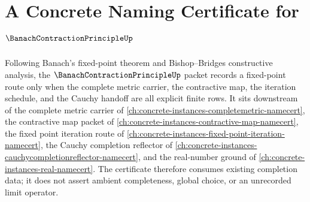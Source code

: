 \chapter{A Concrete Naming Certificate for $\BanachContractionPrincipleUp$}
\label{ch:concrete-instances-banach-contraction-principle-namecert}

Following Banach's fixed-point theorem and Bishop--Bridges constructive
analysis, the $\BanachContractionPrincipleUp$ packet records a fixed-point
route only when the complete metric carrier, the contractive map, the
iteration schedule, and the Cauchy handoff are all explicit finite rows. It
sits downstream of the complete metric carrier of
\autoref{ch:concrete-instances-completemetric-namecert}, the contractive map
packet of \autoref{ch:concrete-instances-contractive-map-namecert}, the fixed
point iteration route of
\autoref{ch:concrete-instances-fixed-point-iteration-namecert}, the Cauchy
completion reflector of
\autoref{ch:concrete-instances-cauchycompletionreflector-namecert}, and the
real-number ground of \autoref{ch:concrete-instances-real-namecert}. The
certificate therefore consumes existing completion data; it does not assert
ambient completeness, global choice, or an unrecorded limit operator.

